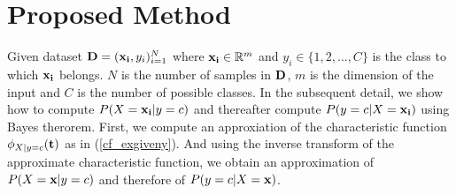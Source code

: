 \documentclass{article}
\begin{document}
 


\printAffiliationsAndNotice{\icmlEqualContribution} %

\begin{abstract} 
\end{abstract} 

\section{Proposed Method}
\label{proposed_method}
Given dataset $\bold{D} = (\bold{x_i},y_i)_{i=1}^{N}$ where $\bold{x_i} \in \mathbb{R}^m$ and $y_i \in \{1,2,\ldots,C\}$ is the class to which $\bold{x_i}$ belongs. $N$ is the number of samples in $\bold{D}$, $m$ is the dimension of the input and $C$ is the number of possible classes. In the subsequent detail, we show how to compute $P(X=\bold{x_i}|y=c)$ and thereafter compute $P(y=c|X=\bold{x_i})$ using Bayes therorem. First, we compute an approxiation of the characteristic function $\phi_{X|y=c}(\bold{t})$ as in (\ref{cf_exgiveny}). And using the inverse transform of the approximate characteristic function, we obtain an approximation of $P(X=\bold{x}|y=c)$ and therefore of $P(y=c|X=\bold{x})$.
\end{document}
